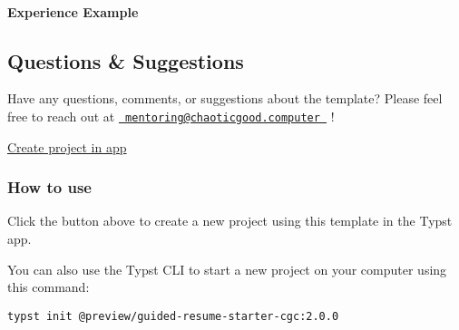 \paragraph{Experience Example}\label{experience-example}

\begin{Shaded}
\begin{Highlighting}[]
\NormalTok{  details: [}
\NormalTok{  ]}
\NormalTok{)}
\end{Highlighting}
\end{Shaded}

\subsection{Questions \& Suggestions}\label{questions-suggestions}

Have any questions, comments, or suggestions about the template? Please
feel free to reach out at
\href{mailto:mentoring@chaoticgood.computer}{\texttt{\ mentoring@chaoticgood.computer\ }}
!

\href{/app?template=guided-resume-starter-cgc&version=2.0.0}{Create
project in app}

\subsubsection{How to use}\label{how-to-use}

Click the button above to create a new project using this template in
the Typst app.

You can also use the Typst CLI to start a new project on your computer
using this command:

\begin{verbatim}
typst init @preview/guided-resume-starter-cgc:2.0.0
\end{verbatim}

